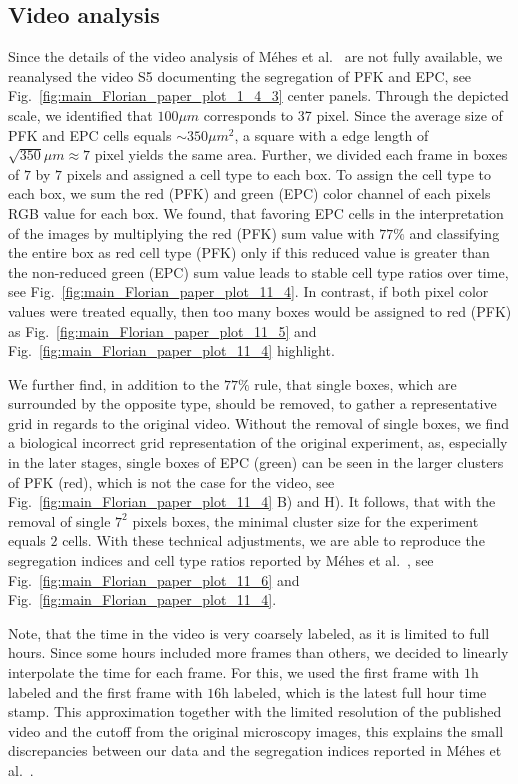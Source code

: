 \documentclass[10pt,letterpaper]{article}
\newcommand{\figref}[1]{Fig.~\ref{fig:#1}}
\begin{document}
\subsection*{Video analysis}

Since the details of the video analysis of Méhes et
al.~\cite{MehMonNemVic2012} are not fully available, we reanalysed the
video S5 documenting the segregation of PFK and EPC, see
\figref{main_Florian_paper_plot_1_4_3} center panels. Through the
depicted scale, we identified that $100\mu m$ corresponds to 37 pixel.
Since the average size of PFK and EPC cells equals $\sim 350\mu m^2$,
a square with a edge length of $\sqrt{350} \mu m\approx 7$ pixel
yields the same area. Further, we divided each frame in boxes of $7$ by
$7$ pixels and assigned a cell type to each box. To assign the cell type to each
box, we sum the red (PFK) and green (EPC) color channel of each pixels
RGB value for each box. We found, that favoring EPC cells in the
interpretation of the images by multiplying the red (PFK) sum value
with $77\%$ and classifying the entire box as red cell type (PFK) only if this
reduced value is greater than the non-reduced green (EPC) sum value leads to
stable cell type ratios over time, see \figref{main_Florian_paper_plot_11_4}.
In contrast, if both pixel color values were treated equally, then too many boxes
would be assigned to red (PFK) as \figref{main_Florian_paper_plot_11_5}
and \figref{main_Florian_paper_plot_11_4} highlight.

We further find, in addition to the $77\%$ rule, that single boxes,
which are surrounded by the opposite type, should be removed, to
gather a representative grid in regards to the original video. Without
the removal of single boxes, we find a biological incorrect grid
representation of the original experiment, as, especially in the later
stages, single boxes of EPC (green) can be seen in the larger clusters
of PFK (red), which is not the case for the video, see
\figref{main_Florian_paper_plot_11_4} B) and H). It follows, that with
the removal of single $7^2$ pixels boxes, the minimal cluster size
for the experiment equals $2$ cells. With these technical adjustments,
we are able to reproduce the segregation indices and cell type ratios
reported by Méhes et al.~\cite{MehMonNemVic2012}, see
\figref{main_Florian_paper_plot_11_6} and
\figref{main_Florian_paper_plot_11_4}.

Note, that the time in the video is very coarsely labeled, as it is
limited to full hours. Since some hours included more frames than
others, we decided to linearly interpolate the time for each frame. For this, we
used the first frame with $1$h labeled and the first frame with $16$h
labeled, which is the latest full hour time stamp. This approximation together
with the limited resolution of the published video and the
cutoff from the original microscopy images, this explains the small
discrepancies between our data and the segregation indices reported in
Méhes et al.~\cite{MehMonNemVic2012}.
\end{document}
